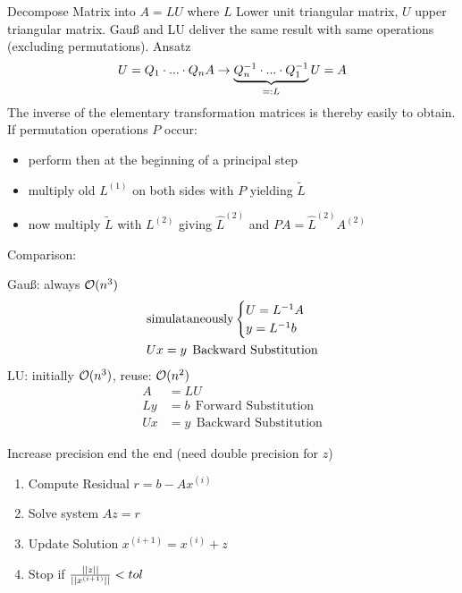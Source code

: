 \begin{definition}
	Decompose Matrix into $A = LU$ where $L$ Lower unit triangular matrix, $U$ upper triangular matrix. Gauß and LU deliver the same result with same operations (excluding permutations). Ansatz
	\begin{align*}
		U = Q_1 \cdot ... \cdot Q_n A \rightarrow \underbrace{Q_n^{-1} \cdot ... \cdot Q_1^{-1}}_{=: L} U = A
	\end{align*}
	The inverse of the elementary transformation matrices is thereby easily to obtain. If permutation operations $P$ occur:
	\begin{itemize}[noitemsep]
		\item perform then at the beginning of a principal step
		\item multiply old $L^{(1)}$ on both sides with $P$ yielding $\tilde{L}$
		\item now multiply $\tilde{L}$ with $L^{(2)}$ giving $\hat{L}^{(2)}$ and $PA = \hat{L}^{(2)}A^{(2)}$
	\end{itemize}

	Comparison:
	
	\begin{multicols}{2}
		Gauß: always $\mathcal{O}(n^3)$
		\begin{align*}
		 \text{simulataneously}	\begin{cases}
				U = L^{-1}A \\
				y = L^{-1}b 
			\end{cases} \\
			Ux = y \medspace \medspace \text{Backward Substitution}
		\end{align*}
		LU: initially $\mathcal{O}(n^3)$, reuse: $\mathcal{O}(n^2)$
		\begin{align*}
			A &= LU \\
			Ly &= b \medspace \medspace \text{Forward Substitution}\\
			Ux &= y \medspace \medspace \text{Backward Substitution}
		\end{align*}
	\end{multicols}
\end{definition}

\begin{definition}
	Increase precision end the end (need double precision for $z$)
	\begin{enumerate}[noitemsep]
		\item Compute Residual $r = b - Ax^{(i)}$
		\item Solve system $Az = r$
		\item Update Solution $x^{(i+1)} = x^{(i)} + z$
		\item Stop if $\frac{||z||}{||x^{(i+1)}||} < tol$
	\end{enumerate}
\end{definition}

